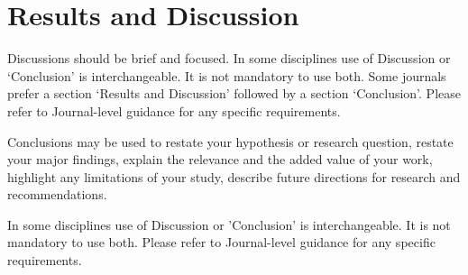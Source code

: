 \documentclass[sn-mathphys,Numbered]{sn-jnl}
\theoremstyle{thmstyleone}%
\theoremstyle{thmstyletwo}%
\theoremstyle{thmstylethree}%
\begin{document}







\section{Results and Discussion}\label{sec12}

Discussions should be brief and focused. In some disciplines use of Discussion or `Conclusion' is interchangeable. It is not mandatory to use both. Some journals prefer a section `Results and Discussion' followed by a section `Conclusion'. Please refer to Journal-level guidance for any specific requirements. 

Conclusions may be used to restate your hypothesis or research question, restate your major findings, explain the relevance and the added value of your work, highlight any limitations of your study, describe future directions for research and recommendations. 

In some disciplines use of Discussion or 'Conclusion' is interchangeable. It is not mandatory to use both. Please refer to Journal-level guidance for any specific requirements. 

\backmatter
\end{document}
